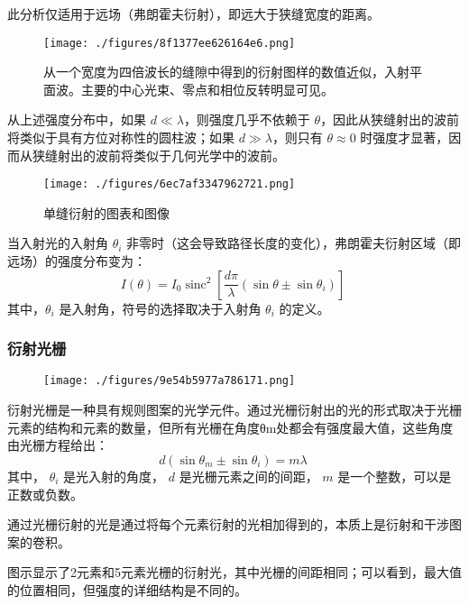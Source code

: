此分析仅适用于远场（弗朗霍夫衍射），即远大于狭缝宽度的距离。
\begin{figure}[ht]
\centering
\texttt{[image: ./figures/8f1377ee626164e6.png]}
\caption{从一个宽度为四倍波长的缝隙中得到的衍射图样的数值近似，入射平面波。主要的中心光束、零点和相位反转明显可见。} \label{fig_YS_16}
\end{figure}
从上述强度分布中，如果 \( d \ll \lambda \)，则强度几乎不依赖于 \( \theta \)，因此从狭缝射出的波前将类似于具有方位对称性的圆柱波；如果 \( d \gg \lambda \)，则只有 \( \theta \approx 0 \) 时强度才显著，因而从狭缝射出的波前将类似于几何光学中的波前。
\begin{figure}[ht]
\centering
\texttt{[image: ./figures/6ec7af3347962721.png]}
\caption{单缝衍射的图表和图像} \label{fig_YS_17}
\end{figure}
当入射光的入射角 \( \theta_i \) 非零时（这会导致路径长度的变化），弗朗霍夫衍射区域（即远场）的强度分布变为：
\[
I(\theta) = I_0 \operatorname{sinc}^2 \left[ \frac{d\pi}{\lambda} (\sin \theta \pm \sin \theta_i) \right]~
\]
其中，\( \theta_i \) 是入射角，符号的选择取决于入射角 \( \theta_i \) 的定义。
\subsubsection{衍射光栅}  
\begin{figure}[ht]
\centering
\texttt{[image: ./figures/9e54b5977a786171.png]}
\caption{} \label{fig_YS_18}
\end{figure} 
衍射光栅是一种具有规则图案的光学元件。通过光栅衍射出的光的形式取决于光栅元素的结构和元素的数量，但所有光栅在角度θm处都会有强度最大值，这些角度由光栅方程给出：  
\[
d\left(\sin {\theta _{m}}\pm \sin {\theta _{i}}\right)=m\lambda~
\]  
其中，  
\(\theta _{i}\) 是光入射的角度，  
\(d\) 是光栅元素之间的间距，  
\(m\) 是一个整数，可以是正数或负数。  

通过光栅衍射的光是通过将每个元素衍射的光相加得到的，本质上是衍射和干涉图案的卷积。  

图示显示了2元素和5元素光栅的衍射光，其中光栅的间距相同；可以看到，最大值的位置相同，但强度的详细结构是不同的。